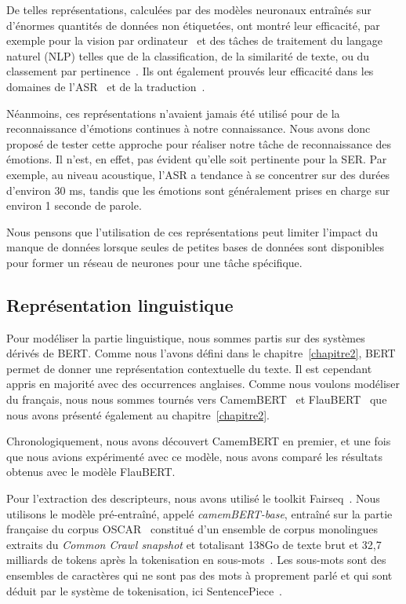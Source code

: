 De telles représentations, calculées par des modèles neuronaux entraînés sur d'énormes quantités de données non étiquetées, ont montré leur efficacité, par exemple pour la vision par ordinateur~\cite{Nanni2017} et des tâches de traitement du langage naturel (NLP) telles que de la
classification, de la similarité de texte, ou du classement par pertinence~\cite{Liu2019,Young2018,Yang2019}. Ils ont également prouvés leur efficacité dans les domaines de l'ASR~\cite{Kahn2020,Liu2020} et de la traduction~\cite{Nguyen2020}.

Néanmoins, ces représentations n'avaient jamais été utilisé pour de la reconnaissance d'émotions continues à notre connaissance. Nous avons donc proposé de tester cette approche pour réaliser notre tâche de reconnaissance des émotions. Il n'est, en effet, pas évident qu'elle soit pertinente pour la SER. Par exemple, au niveau acoustique, l'ASR a tendance à se concentrer sur des durées d'environ 30 ms, tandis que les émotions sont généralement prises en charge sur environ 1 seconde de parole.

Nous pensons que l'utilisation de ces représentations peut limiter l'impact du manque de données lorsque seules de petites bases de données sont disponibles pour former un réseau de neurones pour une tâche spécifique.

\subsection{Représentation linguistique}
Pour modéliser la partie linguistique, nous sommes partis sur des systèmes dérivés de BERT. Comme nous l'avons défini dans le chapitre~\ref{chapitre2}, BERT permet de donner une représentation contextuelle du texte. Il est cependant appris en majorité avec des occurrences anglaises. Comme nous voulons modéliser du français, nous nous sommes tournés vers CamemBERT~\cite{Martin2020} et FlauBERT~\cite{Le2020} que nous avons présenté également au chapitre~\ref{chapitre2}.

Chronologiquement, nous avons découvert CamemBERT en premier, et une fois que nous avions expérimenté avec ce modèle, nous avons comparé les résultats obtenus avec le modèle FlauBERT.

Pour l'extraction des descripteurs, nous avons utilisé le toolkit Fairseq~\cite{Ott2019}. Nous utilisons le modèle pré-entraîné, appelé \textit{camemBERT-base}, entraîné sur la partie française du corpus OSCAR~\cite{Ortizsuarez2019} constitué d'un ensemble de corpus monolingues extraits du \textit{Common Crawl snapshot} et totalisant 138Go de texte brut et 32,7 milliards de tokens après la tokenisation en sous-mots~\cite{Wu2016}. Les sous-mots sont des ensembles de caractères qui ne sont pas des mots à proprement parlé et qui sont déduit par le système de tokenisation, ici SentencePiece~\cite{Kudo2018}.

